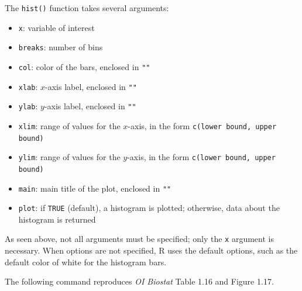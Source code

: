 The \texttt{hist()} function takes several arguments:
\begin{itemize}
\item \texttt{x}: variable of interest
\item \texttt{breaks}: number of bins
\item \texttt{col}: color of the bars, enclosed in \texttt{""}
\item \texttt{xlab}: $x$-axis label, enclosed in \texttt{""}
\item \texttt{ylab}: $y$-axis label, enclosed in \texttt{""}
\item \texttt{xlim}: range of values for the $x$-axis, in the form \texttt{c(lower bound, upper bound)}
\item \texttt{ylim}: range of values for the $y$-axis, in the form \texttt{c(lower bound, upper bound)}
\item \texttt{main}: main title of the plot, enclosed in \texttt{""} 
\item \texttt{plot}: if \texttt{TRUE} (default), a histogram is plotted; otherwise, data about the histogram is returned
\end{itemize}

As seen above, not all arguments must be specified; only the \texttt{x} argument is necessary. When options are not specified, \textsf{R} uses the default options, such as the default color of white for the histogram bars.

The following command reproduces \textit{OI Biostat} Table 1.16 and Figure 1.17.

